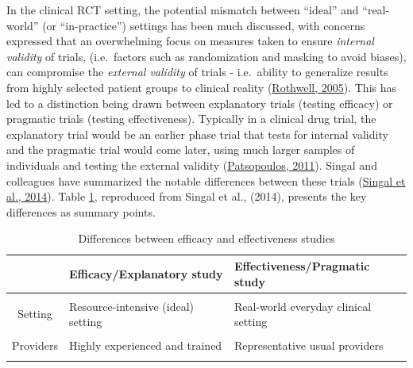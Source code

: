 \documentclass{krantz}
\begin{document}
In the clinical RCT setting, the potential mismatch between ``ideal'' and ``real-world'' (or ``in-practice'') settings has been much discussed, with concerns expressed that an overwhelming focus on measures taken to ensure \emph{internal validity} of trials, (i.e.~factors such as randomization and masking to avoid biases), can compromise the \emph{external validity} of trials - i.e.~ability to generalize results from highly selected patient groups to clinical reality (\protect\hyperlink{ref-rothwell2005}{Rothwell, 2005}). This has led to a distinction being drawn between explanatory trials (testing efficacy) or pragmatic trials (testing effectiveness). Typically in a clinical drug trial, the explanatory trial would be an earlier phase trial that tests for internal validity and the pragmatic trial would come later, using much larger samples of individuals and testing the external validity (\protect\hyperlink{ref-patsopoulos2011}{Patsopoulos, 2011}). Singal and colleagues have summarized the notable differences between these trials (\protect\hyperlink{ref-singal2014}{Singal et al., 2014}). Table \ref{tab:diffeff}, reproduced from Singal et al., (2014), presents the key differences as summary points.

\begin{table}

\caption{\label{tab:diffeff}Differences between efficacy and effectiveness studies}
\centering
\begin{tabular}[t]{c>{\centering\arraybackslash}p{13em}>{\centering\arraybackslash}p{13em}}
\toprule
  & Efficacy/Explanatory study & Effectiveness/Pragmatic study\\
\midrule
\cellcolor{gray!6}{Question} & \cellcolor{gray!6}{Does the intervention work under ideal circumstances?} & \cellcolor{gray!6}{Does the intervention work in real-world practice?}\\
Setting & Resource-intensive (ideal) setting & Real-world everyday clinical setting\\
\cellcolor{gray!6}{Study population} & \cellcolor{gray!6}{Highly selected, homogenous population (Several exclusion criteria)} & \cellcolor{gray!6}{Heterogeneous population (Few to no exclusion criteria)}\\
Providers & Highly experienced and trained & Representative usual providers\\
\cellcolor{gray!6}{Intervention} & \cellcolor{gray!6}{Strictly enforced and standardized. No concurrent interventions} & \cellcolor{gray!6}{Applied with flexibility. Concurrent interventions and cross-over permitted}\\
\bottomrule
\end{tabular}
\end{table}
\end{document}
